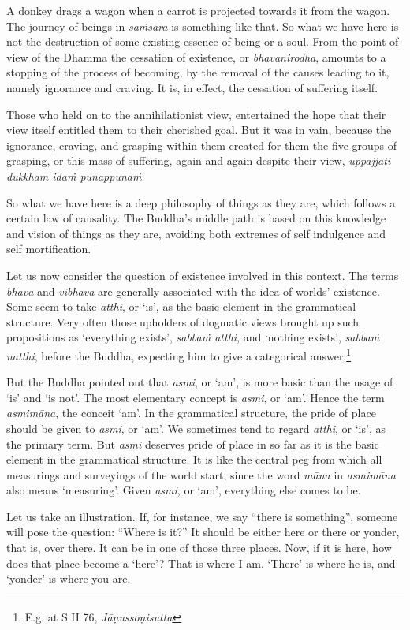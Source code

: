A donkey drags a wagon when a carrot is projected towards it from the wagon. The journey of beings in \emph{saṁsāra} is something like that. So what we have here is not the destruction of some existing essence of being or a soul. From the point of view of the Dhamma the cessation of existence, or \emph{bhavanirodha}, amounts to a stopping of the process of becoming, by the removal of the causes leading to it, namely ignorance and craving. It is, in effect, the cessation of suffering itself.

Those who held on to the annihilationist view, entertained the hope that their view itself entitled them to their cherished goal. But it was in vain, because the ignorance, craving, and grasping within them created for them the five groups of grasping, or this mass of suffering, again and again despite their view, \emph{uppajjati dukkham idaṁ punappunaṁ}.

So what we have here is a deep philosophy of things as they are, which follows a certain law of causality. The Buddha's middle path is based on this knowledge and vision of things as they are, avoiding both extremes of self indulgence and self mortification.

Let us now consider the question of existence involved in this context. The terms \emph{bhava} and \emph{vibhava} are generally associated with the idea of worlds' existence. Some seem to take \emph{atthi}, or `is', as the basic element in the grammatical structure. Very often those upholders of dogmatic views brought up such propositions as `everything exists', \emph{sabbaṁ atthi}, and `nothing exists', \emph{sabbaṁ natthi}, before the Buddha, expecting him to give a categorical answer.\footnote{E.g. at S II 76, \emph{Jāṇussoṇisutta}}

But the Buddha pointed out that \emph{asmi}, or `am', is more basic than the usage of `is' and `is not'. The most elementary concept is \emph{asmi}, or `am'. Hence the term \emph{asmimāna}, the conceit `am'. In the grammatical structure, the pride of place should be given to \emph{asmi}, or `am'. We sometimes tend to regard \emph{atthi}, or `is', as the primary term. But \emph{asmi} deserves pride of place in so far as it is the basic element in the grammatical structure. It is like the central peg from which all measurings and surveyings of the world start, since the word \emph{māna} in \emph{asmimāna} also means `measuring'. Given \emph{asmi}, or `am', everything else comes to be.

Let us take an illustration. If, for instance, we say ``there is something'', someone will pose the question: ``Where is it?'' It should be either here or there or yonder, that is, over there. It can be in one of those three places. Now, if it is here, how does that place become a `here'? That is where I am. `There' is where he is, and `yonder' is where you are.

